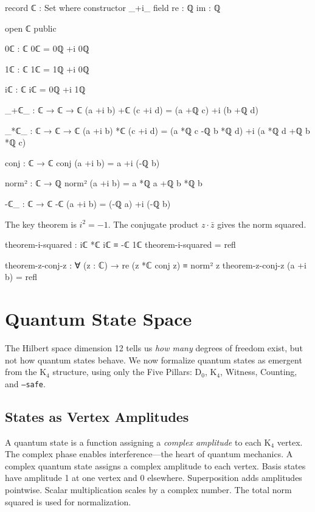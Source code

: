 \documentclass[11pt,a4paper]{book}
\begin{document}
\begin{code}
record ℂ : Set where
  constructor _+i_
  field
    re : ℚ
    im : ℚ

open ℂ public

0ℂ : ℂ
0ℂ = 0ℚ +i 0ℚ

1ℂ : ℂ
1ℂ = 1ℚ +i 0ℚ

iℂ : ℂ
iℂ = 0ℚ +i 1ℚ

_+ℂ_ : ℂ → ℂ → ℂ
(a +i b) +ℂ (c +i d) = (a +ℚ c) +i (b +ℚ d)

_*ℂ_ : ℂ → ℂ → ℂ
(a +i b) *ℂ (c +i d) = (a *ℚ c -ℚ b *ℚ d) +i (a *ℚ d +ℚ b *ℚ c)

conj : ℂ → ℂ
conj (a +i b) = a +i (-ℚ b)

norm² : ℂ → ℚ
norm² (a +i b) = a *ℚ a +ℚ b *ℚ b

-ℂ_ : ℂ → ℂ
-ℂ (a +i b) = (-ℚ a) +i (-ℚ b)
\end{code}

The key theorem is $i^2 = -1$. The conjugate product $z \cdot \bar{z}$ gives the norm squared.

\begin{code}
theorem-i-squared : iℂ *ℂ iℂ ≡ -ℂ 1ℂ
theorem-i-squared = refl

theorem-z-conj-z : ∀ (z : ℂ) → re (z *ℂ conj z) ≡ norm² z
theorem-z-conj-z (a +i b) = refl
\end{code}

\section{Quantum State Space}

The Hilbert space dimension 12 tells us \emph{how many} degrees of freedom exist,
but not how quantum states behave. We now formalize quantum states as emergent
from the K$_4$ structure, using only the Five Pillars: D$_0$, K$_4$, Witness, 
Counting, and \texttt{--safe}.

\subsection{States as Vertex Amplitudes}

A quantum state is a function assigning a \emph{complex amplitude} to each K$_4$ vertex.
The complex phase enables interference—the heart of quantum mechanics. A complex quantum state assigns a complex amplitude to each vertex. Basis states have amplitude 1 at one vertex and 0 elsewhere. Superposition adds amplitudes pointwise. Scalar multiplication scales by a complex number. The total norm squared is used for normalization.
\end{document}
